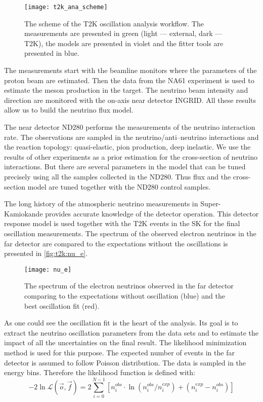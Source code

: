 \documentclass[../main.tex]{subfiles}
\begin{document}
\begin{figure}[!ht]
  \centering
  \texttt{[image: t2k\_ana\_scheme]}
  \caption{The scheme of the T2K oscillation analysis workflow. The measurements are presented in green (light --- external, dark --- T2K), the models are presented in violet and the fitter tools are presented in blue.}
  \label{fig:t2k:ana}
\end{figure}

The measurements start with the beamline monitors where the parameters of the proton beam are estimated. Then the data from the NA61 experiment is used to estimate the meson production in the target. The neutrino beam intensity and direction are monitored with the on-axis near detector INGRID. All these results allow us to build the neutrino flux model.

The near detector ND280 performs the measurements of the neutrino interaction rate. The observations are sampled in the neutrino/anti--neutrino interactions and the reaction topology: quasi-elastic, pion production, deep inelastic. We use the results of other experiments as a prior estimation for the cross-section of neutrino interactions. But there are several parameters in the model that can be tuned precisely using all the samples collected in the ND280. Thus flux and the cross-section model are tuned together with the ND280 control samples.

The long history of the atmospheric neutrino measurements in Super-Kamiokande provides accurate knowledge of the detector operation. This detector response model is used together with the T2K events in the SK for the final oscillation measurements. The spectrum of the observed electron neutrinos in the far detector are compared to the expectations without the oscillations is presented in \autoref{fig:t2k:nu_e}.

\begin{figure}[!ht]
  \centering
  \texttt{[image: nu\_e]}
  \caption{The spectrum of the electron neutrinos observed in the far detector comparing to the expectations without oscillation (blue) and the best oscillation fit (red).}
  \label{fig:t2k:nu_e}
\end{figure}

As one could see the oscillation fit is the heart of the analysis. Its goal is to extract the neutrino oscillation parameters from the data sets and to estimate the impact of all the uncertainties on the final result. The likelihood minimization method is used for this purpose. The expected number of events in the far detector is assumed to follow Poisson distribution. The data is sampled in the energy bins. Therefore the likelihood function is defined with:
\begin{equation}
-2\ln\mathcal{L}\left(\overrightarrow{o}, \overrightarrow{f}\right)=2\sum^{N-1}_{i=0}\left[n_i^{obs}\cdot\ln\left(n_i^{obs}/n_i^{exp}\right)+\left(n_i^{exp}-n_i^{obs}\right)\right]
\end{equation}
\end{document}

